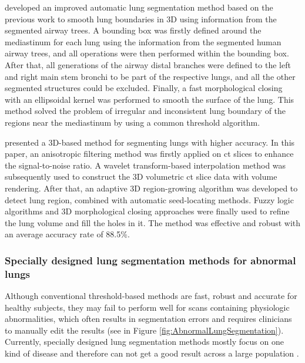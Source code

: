 \cite{ukil2005smoothing} developed an improved automatic lung segmentation method based on the previous work \citep{hu2001automatic} to smooth lung boundaries in 3D using information from the segmented airway trees. A bounding box was firstly defined around the mediastinum for each lung using the information from the segmented human airway trees, and all operations were then performed within the bounding box. After that, all generations of the airway distal branches were defined to the left and right main stem bronchi to be part of the respective lungs, and all the other segmented structures could be excluded. Finally, a fast morphological closing with an ellipsoidal kernel was performed to smooth the surface of the lung. This method solved the problem of irregular and inconsistent lung boundary of the regions near the mediastinum by using a common threshold algorithm. 

\cite{sun20063d} presented a 3D-based method for segmenting lungs with higher accuracy. In this paper, an anisotropic filtering method was firstly applied on \gls{ct} slices to enhance the signal-to-noise ratio. A wavelet transform-based interpolation method was subsequently used to construct the 3D volumetric \gls{ct} slice data with volume rendering. After that, an adaptive 3D region-growing algorithm was developed to detect lung region, combined with automatic seed-locating methods. Fuzzy logic algorithms and 3D morphological closing approaches were finally used to refine the lung volume and fill the holes in it. The method was effective and robust with an average accuracy rate of 88.5\%.  

\subsubsection{Specially designed lung segmentation methods for abnormal lungs}
Although conventional threshold-based methods are fast, robust and accurate for healthy subjects, they may fail to perform well for scans containing physiologic abnormalities, which often results in segmentation errors and requires clinicians to manually edit the results (see in Figure \ref{fig:AbnormalLungSegmentation}). Currently, specially designed lung segmentation methods mostly focus on one kind of disease and therefore can not get a good result across a large population \citep{kitasaka2003lung,sluimer2005toward,pu2008adaptive,pu2011shape,prasad2008automatic,korfiatis2008texture,wang2009automated,van2009automatic,sun2012automated}. 

